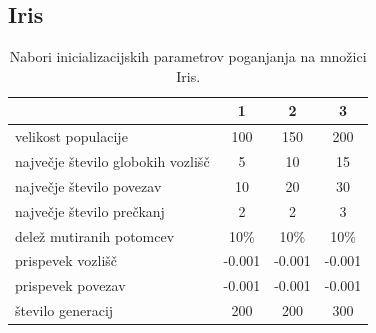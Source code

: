 \subsection{Iris}\label{subsec:iris_test}
\begin{table}[H]
    \caption{Nabori inicializacijskih parametrov poganjanja na množici Iris.}
    \begin{center}
        \begin{tabular}{||l c c c||}
            \hline
            & 1      & 2      & 3 \\ [0.5ex]
            \hline
            velikost populacije               & 100    & 150    & 200    \\
            \hline
            največje število globokih vozlišč & 5      & 10     & 15     \\
            \hline
            največje število povezav          & 10     & 20     & 30     \\
            \hline
            največje število prečkanj         & 2      & 2      & 3      \\
            \hline
            delež mutiranih potomcev          & 10\%   & 10\%   & 10\%   \\
            \hline
            prispevek vozlišč                 & -0.001 & -0.001 & -0.001 \\
            \hline
            prispevek povezav                 & -0.001 & -0.001 & -0.001 \\
            \hline
            število generacij                 & 200    & 200    & 300    \\
            \hline
        \end{tabular}
    \end{center}
    \label{tab:param_iris}
\end{table}

